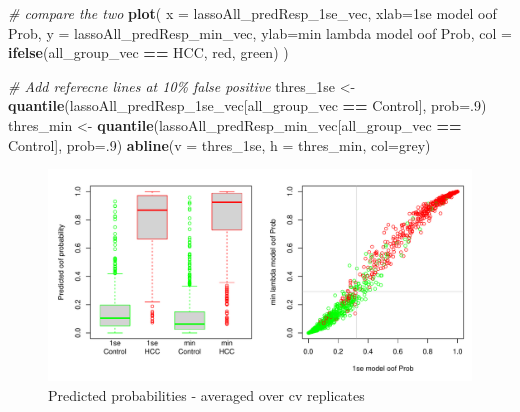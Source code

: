 \documentclass[
]{book}
\newenvironment{Shaded}{\begin{snugshade}}{\end{snugshade}}
\newcommand{\CommentTok}[1]{\textcolor[rgb]{0.56,0.35,0.01}{\textit{#1}}}
\newcommand{\DataTypeTok}[1]{\textcolor[rgb]{0.13,0.29,0.53}{#1}}
\newcommand{\DecValTok}[1]{\textcolor[rgb]{0.00,0.00,0.81}{#1}}
\newcommand{\KeywordTok}[1]{\textcolor[rgb]{0.13,0.29,0.53}{\textbf{#1}}}
\newcommand{\NormalTok}[1]{#1}
\newcommand{\OperatorTok}[1]{\textcolor[rgb]{0.81,0.36,0.00}{\textbf{#1}}}
\newcommand{\StringTok}[1]{\textcolor[rgb]{0.31,0.60,0.02}{#1}}
\begin{document}
\begin{Shaded}
\begin{Highlighting}[]
\CommentTok{\# compare the two}
\KeywordTok{plot}\NormalTok{(}
 \DataTypeTok{x =}\NormalTok{ lassoAll\_predResp\_1se\_vec, }\DataTypeTok{xlab=}\StringTok{\textquotesingle{}1se model oof Prob\textquotesingle{}}\NormalTok{,}
 \DataTypeTok{y =}\NormalTok{ lassoAll\_predResp\_min\_vec, }\DataTypeTok{ylab=}\StringTok{\textquotesingle{}min lambda model oof Prob\textquotesingle{}}\NormalTok{,}
 \DataTypeTok{col =} \KeywordTok{ifelse}\NormalTok{(all\_group\_vec }\OperatorTok{==}\StringTok{ \textquotesingle{}HCC\textquotesingle{}}\NormalTok{, }\StringTok{\textquotesingle{}red\textquotesingle{}}\NormalTok{, }\StringTok{\textquotesingle{}green\textquotesingle{}}\NormalTok{)}
\NormalTok{)}
 
\CommentTok{\# Add referecne lines at 10\% false positive}
\NormalTok{thres\_1se <{-}}\StringTok{ }\KeywordTok{quantile}\NormalTok{(lassoAll\_predResp\_1se\_vec[all\_group\_vec }\OperatorTok{==}\StringTok{ \textquotesingle{}Control\textquotesingle{}}\NormalTok{], }\DataTypeTok{prob=}\NormalTok{.}\DecValTok{9}\NormalTok{)}
\NormalTok{thres\_min <{-}}\StringTok{ }\KeywordTok{quantile}\NormalTok{(lassoAll\_predResp\_min\_vec[all\_group\_vec }\OperatorTok{==}\StringTok{ \textquotesingle{}Control\textquotesingle{}}\NormalTok{], }\DataTypeTok{prob=}\NormalTok{.}\DecValTok{9}\NormalTok{)}
\KeywordTok{abline}\NormalTok{(}\DataTypeTok{v =}\NormalTok{ thres\_1se, }\DataTypeTok{h =}\NormalTok{ thres\_min, }\DataTypeTok{col=}\StringTok{\textquotesingle{}grey\textquotesingle{}}\NormalTok{)}
\end{Highlighting}
\end{Shaded}

\begin{figure}
\centering
\includegraphics{Static/figures/get-sample-pred-1.pdf}
\caption{\label{fig:get-sample-pred}Predicted probabilities - averaged over cv replicates}
\end{figure}
\end{document}
